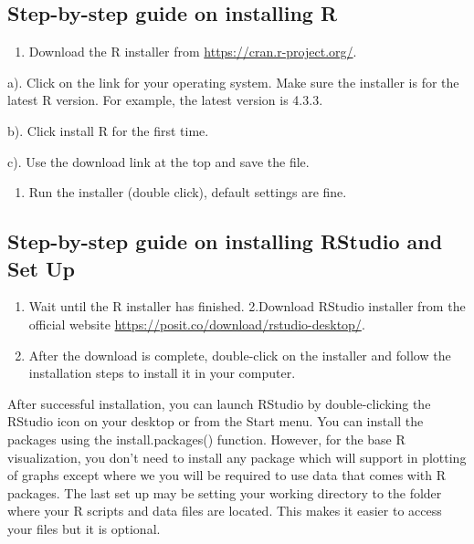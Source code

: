 \documentclass[
]{book}
\providecommand{\tightlist}{%
  \setlength{\itemsep}{0pt}\setlength{\parskip}{0pt}}
\begin{document}
\subsection{Step-by-step guide on installing R}\label{step-by-step-guide-on-installing-r}

\begin{enumerate}
\def\labelenumi{\arabic{enumi}.}
\tightlist
\item
  Download the R installer from \url{https://cran.r-project.org/}.
\end{enumerate}

a). Click on the link for your operating system. Make sure the installer is for the latest R version. For example, the latest version is 4.3.3.

b). Click install R for the first time.

c). Use the download link at the top and save the file.

\begin{enumerate}
\def\labelenumi{\arabic{enumi}.}
\setcounter{enumi}{1}
\tightlist
\item
  Run the installer (double click), default settings are fine.
\end{enumerate}

\subsection{Step-by-step guide on installing RStudio and Set Up}\label{step-by-step-guide-on-installing-rstudio-and-set-up}

\begin{enumerate}
\def\labelenumi{\arabic{enumi}.}
\tightlist
\item
  Wait until the R installer has finished.
  2.Download RStudio installer from the official website \url{https://posit.co/download/rstudio-desktop/}.
\item
  After the download is complete, double-click on the installer and follow the installation steps to install it in your computer.
\end{enumerate}

After successful installation, you can launch RStudio by double-clicking the RStudio icon on your desktop or from the Start menu. You can install the packages using the install.packages() function. However, for the base R visualization, you don't need to install any package which will support in plotting of graphs except where we you will be required to use data that comes with R packages. The last set up may be setting your working directory to the folder where your R scripts and data files are located. This makes it easier to access your files but it is optional.
\end{document}
